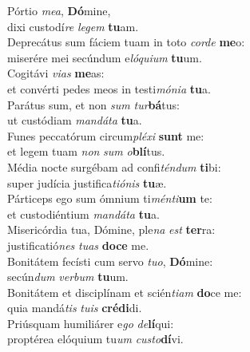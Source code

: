 \oddverse Pórtio \textit{me}\textit{a}, \textbf{Dó}mine,~\*\\
\oddverse dixi custodí\textit{re} \textit{le}\textit{gem} \textbf{tu}am.\\
\evenverse Deprecátus sum fáciem tuam in toto \textit{cor}\textit{de} \textbf{me}o:~\*\\
\evenverse miserére mei secúndum e\textit{ló}\textit{qui}\textit{um} \textbf{tu}um.\\
\oddverse Cogitávi \textit{vi}\textit{as} \textbf{me}as:~\*\\
\oddverse et convérti pedes meos in testi\textit{mó}\textit{ni}\textit{a} \textbf{tu}a.\\
\evenverse Parátus sum, et non \textit{sum} \textit{tur}\textbf{bá}tus:~\*\\
\evenverse ut custódiam \textit{man}\textit{dá}\textit{ta} \textbf{tu}a.\\
\oddverse Funes peccatórum circum\textit{plé}\textit{xi} \textbf{sunt} me:~\*\\
\oddverse et legem tuam \textit{non} \textit{sum} \textit{o}\textbf{blí}tus.\\
\evenverse Média nocte surgébam ad confi\textit{tén}\textit{dum} \textbf{ti}bi:~\*\\
\evenverse super judícia justifica\textit{ti}\textit{ó}\textit{nis} \textbf{tu}æ.\\
\oddverse Párticeps ego sum ómnium ti\textit{mén}\textit{ti}\textbf{um} te:~\*\\
\oddverse et custodiéntium \textit{man}\textit{dá}\textit{ta} \textbf{tu}a.\\
\evenverse Misericórdia tua, Dómine, ple\textit{na} \textit{est} \textbf{ter}ra:~\*\\
\evenverse justificatió\textit{nes} \textit{tu}\textit{as} \textbf{do}\textbf{ce} me.\\
\oddverse Bonitátem fecísti cum servo \textit{tu}\textit{o}, \textbf{Dó}mine:~\*\\
\oddverse secún\textit{dum} \textit{ver}\textit{bum} \textbf{tu}um.\\
\evenverse Bonitátem et disciplínam et scién\textit{ti}\textit{am} \textbf{do}ce me:~\*\\
\evenverse quia mandá\textit{tis} \textit{tu}\textit{is} \textbf{cré}\textbf{di}di.\\
\oddverse Priúsquam humiliárer e\textit{go} \textit{de}\textbf{lí}qui:~\*\\
\oddverse proptérea elóquium tu\textit{um} \textit{cu}\textit{sto}\textbf{dí}vi.\\
